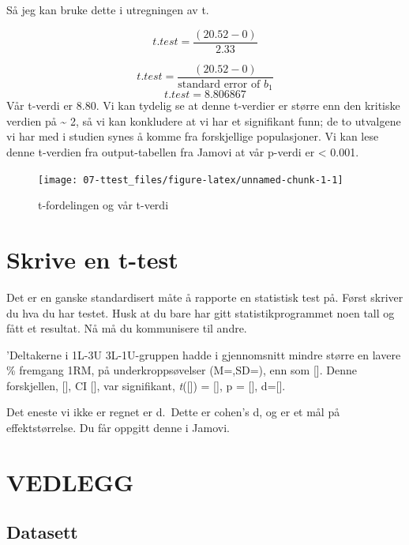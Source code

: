 \documentclass[
]{book}
\begin{document}
Så jeg kan bruke dette i utregningen av t.

\[
t.test = \frac{(20.52 - 0)}{2.33}
\]

\[
t.test = \frac{(20.52 - 0)}{\text{standard error of } b_1}
\]
\[
t.test = 8.806867
\]
Vår t-verdi er 8.80. Vi kan tydelig se at denne t-verdier er større enn den kritiske verdien på \textasciitilde{} 2, så vi kan konkludere at vi har et signifikant funn; de to utvalgene vi har med i studien synes å komme fra forskjellige populasjoner. Vi kan lese denne t-verdien fra output-tabellen fra Jamovi at vår p-verdi er \textless{} 0.001.

\begin{figure}

{\centering \texttt{[image: 07-ttest\_files/figure-latex/unnamed-chunk-1-1]} 

}

\caption{t-fordelingen og vår t-verdi}\label{fig:unnamed-chunk-1}
\end{figure}

\hypertarget{skrive-en-t-test}{%
\chapter{Skrive en t-test}\label{skrive-en-t-test}}

Det er en ganske standardisert måte å rapporte en statistisk test på. Først skriver du hva du har testet. Husk at du bare har gitt statistikprogrammet noen tall og fått et resultat. Nå må du kommunisere til andre.

'Deltakerne i 1L-3U 3L-1U-gruppen hadde i gjennomsnitt mindre større en lavere \% fremgang 1RM, på underkroppsøvelser (M=,SD=), enn som {[}{]}. Denne forskjellen, {[}{]}, CI {[}{]}, var signifikant, \emph{t}({[}{]}) = {[}{]}, p = {[}{]}, d={[}{]}.

Det eneste vi ikke er regnet er d.~Dette er cohen's d, og er et mål på effektstørrelse. Du får oppgitt denne i Jamovi.

\hypertarget{vedlegg}{%
\chapter{VEDLEGG}\label{vedlegg}}

\hypertarget{datasett-1}{%
\section{Datasett}\label{datasett-1}}
\end{document}
